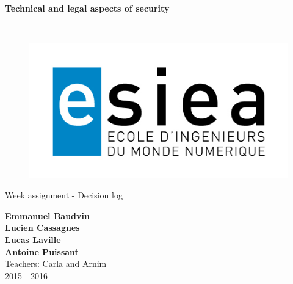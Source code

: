 \begin{titlepage}
      \begin{center}   
        \Huge
        \textbf{Technical and legal aspects of security}
        
        \LARGE
        ~
        
        
        \vfill
        \begin{figure}[H]
	    \centering
	    \begin{minipage}{0.9\textwidth}
		\centering
		\includegraphics[width=\textwidth]{./img/esiea.jpeg}
	    \end{minipage}\hfill
	\end{figure}
        \vfill
        
        \vspace{0.5cm}
        
        Week assignment - Decision log
        
        \vspace{2cm}
        \textbf{Emmanuel Baudvin}\\
				\textbf{Lucien Cassagnes}\\
				\textbf{Lucas Laville}\\
				\textbf{Antoine Puissant}\\
        \vspace{0.8cm}
        \Large
        \underline{Teachers:} Carla and Arnim\\
        \vspace{0.5cm}
        2015 - 2016%
    \end{center}
\end{titlepage}